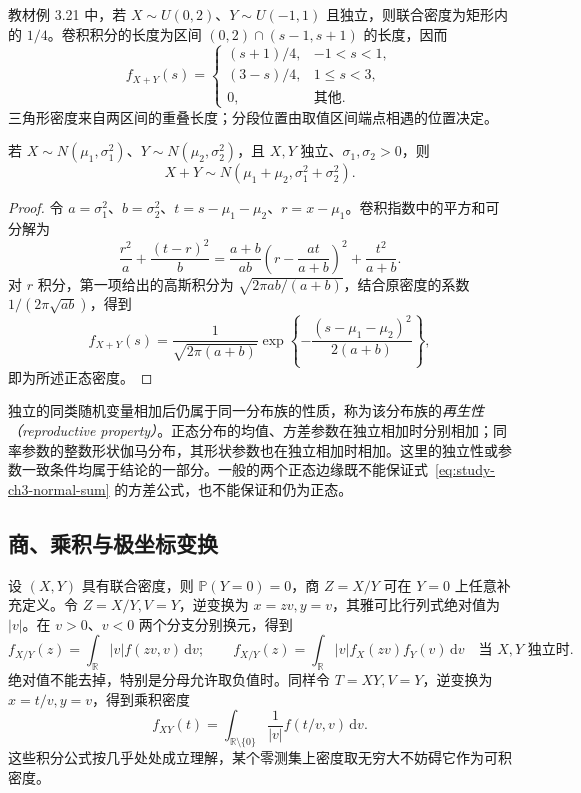 教材例 3.21 中，若 $X\sim U(0,2)$、$Y\sim U(-1,1)$ 且独立，则联合密度为矩形内的 $1/4$。卷积积分的长度为区间 $(0,2)\cap(s-1,s+1)$ 的长度，因而
\[
  f_{X+Y}(s)=
  \begin{cases}
    (s+1)/4,&-1<s<1,\\
    (3-s)/4,&1\le s<3,\\
    0,&\text{其他}.
  \end{cases}
\]
三角形密度来自两区间的重叠长度；分段位置由取值区间端点相遇的位置决定。

\begin{proposition}
\label{prop:study-ch3-normal-sum}
若 $X\sim N(\mu_1,\sigma_1^2)$、$Y\sim N(\mu_2,\sigma_2^2)$，且 $X,Y$ 独立、$\sigma_1,\sigma_2>0$，则
\begin{equation}
  X+Y\sim N(\mu_1+\mu_2,\sigma_1^2+\sigma_2^2).
  \label{eq:study-ch3-normal-sum}
\end{equation}
\end{proposition}

\begin{proof}
令 $a=\sigma_1^2$、$b=\sigma_2^2$、$t=s-\mu_1-\mu_2$、$r=x-\mu_1$。卷积指数中的平方和可分解为
\[
  \frac{r^2}{a}+\frac{(t-r)^2}{b}
  =\frac{a+b}{ab}\left(r-\frac{at}{a+b}\right)^2
   +\frac{t^2}{a+b}.
\]
对 $r$ 积分，第一项给出的高斯积分为 $\sqrt{2\pi ab/(a+b)}$，结合原密度的系数 $1/(2\pi\sqrt{ab})$，得到
\[
  f_{X+Y}(s)=\frac1{\sqrt{2\pi(a+b)}}
    \exp\!\left\{-\frac{(s-\mu_1-\mu_2)^2}{2(a+b)}\right\},
\]
即为所述正态密度。
\end{proof}

独立的同类随机变量相加后仍属于同一分布族的性质，称为该分布族的\emph{再生性（reproductive property）}。正态分布的均值、方差参数在独立相加时分别相加；同率参数的整数形状伽马分布，其形状参数也在独立相加时相加。这里的独立性或参数一致条件均属于结论的一部分。一般的两个正态边缘既不能保证式~\eqref{eq:study-ch3-normal-sum} 的方差公式，也不能保证和仍为正态。

\subsection{商、乘积与极坐标变换}

设 $(X,Y)$ 具有联合密度，则 $\mathbb P(Y=0)=0$，商 $Z=X/Y$ 可在 $Y=0$ 上任意补充定义。令 $Z=X/Y,V=Y$，逆变换为 $x=zv,y=v$，其雅可比行列式绝对值为 $|v|$。在 $v>0$、$v<0$ 两个分支分别换元，得到
\begin{equation}
  f_{X/Y}(z)=\int_{\mathbb R}|v|f(zv,v)\,\mathrm dv;
  \qquad
  f_{X/Y}(z)=\int_{\mathbb R}|v|f_X(zv)f_Y(v)\,\mathrm dv
  \quad\text{当 $X,Y$ 独立时}.
  \label{eq:study-ch3-ratio-density}
\end{equation}
绝对值不能去掉，特别是分母允许取负值时。同样令 $T=XY,V=Y$，逆变换为 $x=t/v,y=v$，得到乘积密度
\begin{equation}
  f_{XY}(t)=\int_{\mathbb R\setminus\{0\}}
    \frac1{|v|}f(t/v,v)\,\mathrm dv.
  \label{eq:study-ch3-product-density}
\end{equation}
这些积分公式按几乎处处成立理解，某个零测集上密度取无穷大不妨碍它作为可积密度。

